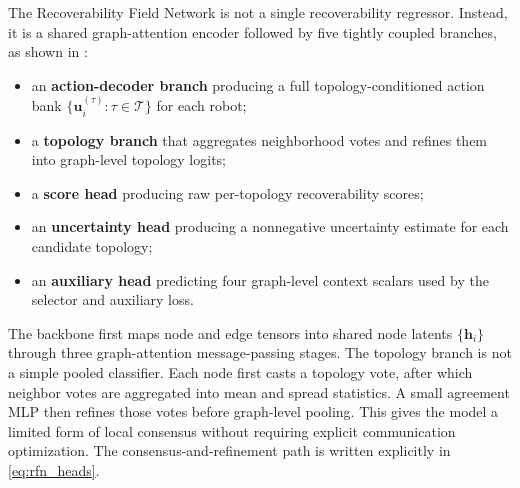 \documentclass{ieeeaccess}
\newcommand{\cT}{\mathcal{T}}
\newcommand{\bfu}{\mathbf{u}}
\begin{document}
The Recoverability Field Network is not a single recoverability
regressor. Instead, it is a shared graph-attention encoder followed by
five tightly coupled branches, as shown in :
\begin{itemize}
    \item an \textbf{action-decoder branch} producing a full topology-conditioned action bank $\{\bfu_i^{(\tau)} : \tau \in \cT\}$ for each robot;
    \item a \textbf{topology branch} that aggregates neighborhood votes and refines them into graph-level topology logits;
    \item a \textbf{score head} producing raw per-topology recoverability scores;
    \item an \textbf{uncertainty head} producing a nonnegative uncertainty estimate for each candidate topology;
    \item an \textbf{auxiliary head} predicting four graph-level context scalars used by the selector and auxiliary loss.
\end{itemize}

The backbone first maps node and edge tensors into shared node latents
$\{\mathbf{h}_i\}$ through three graph-attention message-passing
stages. The topology branch is not a simple pooled classifier. Each
node first casts a topology vote, after which neighbor votes are
aggregated into mean and spread statistics. A small agreement MLP then
refines those votes before graph-level pooling. This gives the model a
limited form of local consensus without requiring explicit
communication optimization. The consensus-and-refinement path is
written explicitly in \eqref{eq:rfn_heads}.
\end{document}

